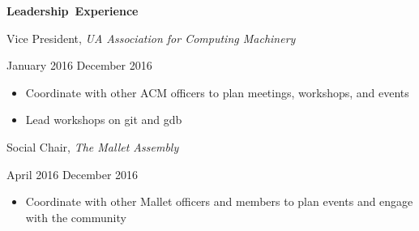 \documentclass[11pt]{article}
\begin{document}
\vspace{0.8em}
\hbox{\large \textbf{Leadership Experience}}

\vspace{0.4em}
\begin{minipage}[t]{0.65\textwidth}
\flushleft
Vice President, \textit{UA Association for Computing Machinery}\\
\end{minipage}
\begin{minipage}[t]{0.30\textwidth}
\flushright
January 2016 \space \textemdash \space December 2016\\
\end{minipage}

\begin{itemize}
  \item Coordinate with other ACM officers to plan meetings, workshops, and events
  \item Lead workshops on git and gdb
\end{itemize}

\vspace{0.4em}
\begin{minipage}[t]{0.65\textwidth}
\flushleft
Social Chair, \textit{The Mallet Assembly}\\
\end{minipage}
\begin{minipage}[t]{0.30\textwidth}
\flushright
April 2016 \space \textemdash \space December 2016\\
\end{minipage}

\begin{itemize}
  \item Coordinate with other Mallet officers and members to plan events and engage with the community
\end{itemize}
\end{document}

